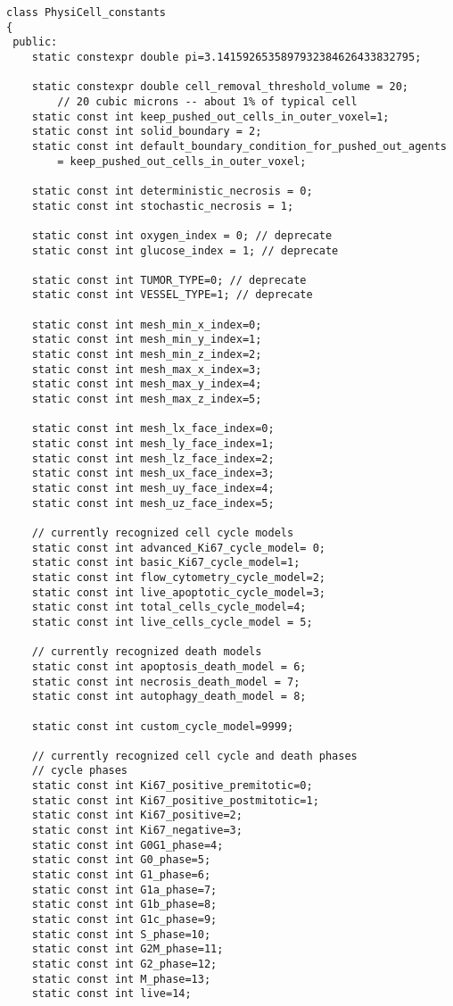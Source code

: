 \documentclass[12pt]{article}
\begin{document}
\begin{verbatim}
class PhysiCell_constants
{
 public:
    static constexpr double pi=3.1415926535897932384626433832795;
    
    static constexpr double cell_removal_threshold_volume = 20; 
        // 20 cubic microns -- about 1% of typical cell 
    static const int keep_pushed_out_cells_in_outer_voxel=1;
    static const int solid_boundary = 2;
    static const int default_boundary_condition_for_pushed_out_agents 
        = keep_pushed_out_cells_in_outer_voxel;        
    
    static const int deterministic_necrosis = 0;
    static const int stochastic_necrosis = 1;

    static const int oxygen_index = 0; // deprecate
    static const int glucose_index = 1; // deprecate 
    
    static const int TUMOR_TYPE=0; // deprecate 
    static const int VESSEL_TYPE=1; // deprecate 

    static const int mesh_min_x_index=0;
    static const int mesh_min_y_index=1;
    static const int mesh_min_z_index=2;
    static const int mesh_max_x_index=3;
    static const int mesh_max_y_index=4;
    static const int mesh_max_z_index=5;            
    
    static const int mesh_lx_face_index=0;
    static const int mesh_ly_face_index=1;
    static const int mesh_lz_face_index=2;
    static const int mesh_ux_face_index=3;
    static const int mesh_uy_face_index=4;
    static const int mesh_uz_face_index=5;
    
    // currently recognized cell cycle models 
    static const int advanced_Ki67_cycle_model= 0;
    static const int basic_Ki67_cycle_model=1;
    static const int flow_cytometry_cycle_model=2;
    static const int live_apoptotic_cycle_model=3;
    static const int total_cells_cycle_model=4;
    static const int live_cells_cycle_model = 5; 
    
    // currently recognized death models 
    static const int apoptosis_death_model = 6; 
    static const int necrosis_death_model = 7; 
    static const int autophagy_death_model = 8; 
    
    static const int custom_cycle_model=9999; 
    
    // currently recognized cell cycle and death phases 
    // cycle phases
    static const int Ki67_positive_premitotic=0; 
    static const int Ki67_positive_postmitotic=1; 
    static const int Ki67_positive=2; 
    static const int Ki67_negative=3; 
    static const int G0G1_phase=4;
    static const int G0_phase=5;
    static const int G1_phase=6; 
    static const int G1a_phase=7; 
    static const int G1b_phase=8;
    static const int G1c_phase=9;
    static const int S_phase=10;
    static const int G2M_phase=11;
    static const int G2_phase=12;
    static const int M_phase=13;
    static const int live=14;
    

\end{verbatim}
\end{document}
